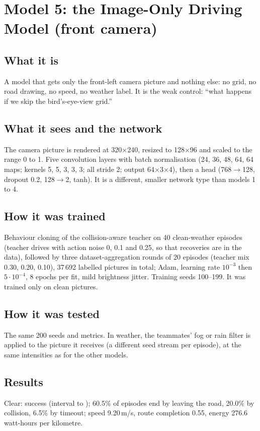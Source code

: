 \documentclass[11pt,a4paper]{article}
\begin{document}
\section{Model 5: the Image-Only Driving Model (front camera)}
\subsection{What it is}
A model that gets only the front-left camera picture and nothing else: no grid, no road drawing, no speed, no weather label. It is the weak control: ``what happens if we skip the bird's-eye-view grid.''
\subsection{What it sees and the network}
The camera picture is rendered at 320$\times$240, resized to 128$\times$96 and scaled to the range 0 to 1. Five convolution layers with batch normalisation (24, 36, 48, 64, 64 maps; kernels 5, 5, 3, 3, 3; all stride 2; output 64$\times$3$\times$4), then a head (768$\to$128, dropout 0.2, 128$\to$2, tanh). It is a different, smaller network type than models 1 to 4.
\subsection{How it was trained}
Behaviour cloning of the collision-aware teacher on 40 clean-weather episodes (teacher drives with action noise 0, 0.1 and 0.25, so that recoveries are in the data), followed by three dataset-aggregation rounds of 20 episodes (teacher mix 0.30, 0.20, 0.10), 37\,692 labelled pictures in total; Adam, learning rate $10^{-3}$ then $5\cdot10^{-4}$, 8 epochs per fit, mild brightness jitter. Training seeds 100--199. It was trained only on clean pictures.
\subsection{How it was tested}
The same 200 seeds and metrics. In weather, the teammates' fog or rain filter is applied to the picture it receives (a different seed stream per episode), at the same intensities as for the other models.
\subsection{Results}
Clear: success \VcamSuccessClear{} (interval \VcamLowClear{} to \VcamHighClear{}); 60.5\% of episodes end by leaving the road, 20.0\% by collision, 6.5\% by timeout; speed 9.20\,m/s, route completion 0.55, energy 276.6 watt-hours per kilometre. \VcamWeatherSentence
\end{document}
